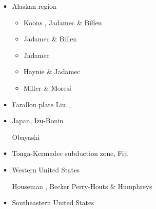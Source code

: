 \begin{itemize}
\item{Alaskan region} 

\begin{scriptsize}
\begin{itemize}
\item[\twothousandten] Koons \etal \cite{kohp10}, Jadamec \& Billen \cite{jabi10a}
\item[\twothousandtwelve] Jadamec \& Billen \cite{jabi12}
\item[\twothousandthirteen] Jadamec \etal \cite{jabr13}
\item[\twothousandseventeen] Haynie \& Jadamec \cite{haja17}
\item[\twothousandeighteen] Miller \& Moresi \cite{mimo18}
\end{itemize}
\end{scriptsize}

\item{Farallon plate} 
{\scriptsize
Liu \etal \cite{lisg08},
\cite{list11}
\cite{list12}
\cite{licu16}
}
\item{Japan, Izu-Bonin} 

\begin{scriptsize}
\cite{hond85}
\cite{lohd07}
Obayashi \etal \cite{obyf09}\\
\cite{vakn12}
\cite{musi13}
\cite{kigk14}\cite{leli14}\cite{mova14}\cite{hond14}
\cite{kilk15}
\cite{yagz17}
\cite{yamg19}
\cite{mapg20}
\end{scriptsize}

\item{Tonga-Kermadec subduction zone, Fiji} 

\begin{scriptsize}
\cite{bigs03}\cite{bigu03}
\cite{zhpy06}
\end{scriptsize}

\item{Western United States}


\begin{scriptsize}
Houseman \etal \cite{honk00},
Becker \etal \cite{besb06}
Perry-Houts \& Humphreys \cite{pehu18}
\end{scriptsize}


\item{Southeastern United States}


\end{itemize}
